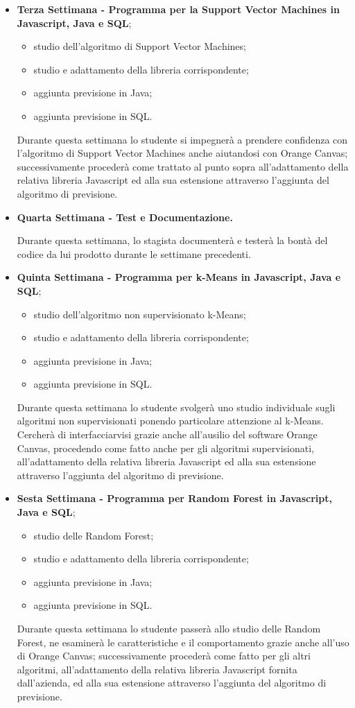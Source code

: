 \begin{itemize}
\item \textbf{Terza Settimana - Programma per la Support Vector Machines in Javascript, Java e SQL};
	\begin{itemize}
	\item studio dell'algoritmo di Support Vector Machines;
	\item studio e adattamento della libreria corrispondente;
	\item aggiunta previsione in Java; 
	\item aggiunta previsione in SQL.
	\end{itemize}
	Durante questa settimana lo studente si impegnerà a prendere confidenza con l'algoritmo di Support Vector Machines anche aiutandosi con Orange Canvas; successivamente procederà come trattato al punto sopra all'adattamento della relativa libreria Javascript ed alla sua estensione attraverso l'aggiunta del algoritmo di previsione.


\item \textbf{Quarta Settimana - Test e Documentazione.}
	\par Durante questa settimana, lo stagista documenterà e testerà la bontà del codice da lui prodotto durante le settimane precedenti.

\item \textbf{Quinta Settimana - Programma per k-Means in Javascript, Java e SQL};
\begin{itemize}
	\item studio dell'algoritmo non supervisionato k-Means;
	\item studio e adattamento della libreria corrispondente;
	\item aggiunta previsione in Java;
	\item aggiunta previsione in SQL.
	\end{itemize}
	Durante questa settimana lo studente svolgerà uno studio individuale sugli algoritmi non supervisionati ponendo particolare attenzione al k-Means. Cercherà di interfacciarvisi grazie anche all'ausilio del software Orange Canvas, procedendo come fatto anche per gli algoritmi supervisionati, all'adattamento della relativa libreria Javascript ed alla sua estensione attraverso l'aggiunta del algoritmo di previsione.
	
	
\item \textbf{Sesta Settimana - Programma per Random Forest in Javascript, Java e SQL};
\begin{itemize}
	\item studio delle Random Forest;
	\item studio e adattamento della libreria corrispondente;
	\item aggiunta previsione in Java;
	\item aggiunta previsione in SQL.
	\end{itemize}
	Durante questa settimana lo studente passerà allo studio delle Random Forest, ne esaminerà le caratteristiche e il comportamento grazie anche all'uso di Orange Canvas; successivamente procederà come fatto per gli altri algoritmi, all'adattamento della relativa libreria Javascript fornita dall'azienda, ed alla sua estensione attraverso l'aggiunta del algoritmo di previsione.
	

\end{itemize}
